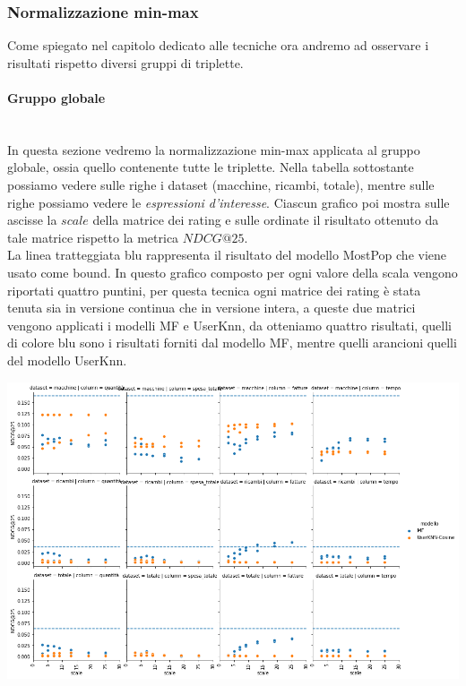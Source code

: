 
\subsubsection{Normalizzazione min-max}
Come spiegato nel capitolo dedicato alle tecniche ora andremo ad osservare i risultati rispetto diversi gruppi di triplette.\\

\paragraph{Gruppo globale}\mbox{} \\
In questa sezione vedremo la normalizzazione min-max applicata al gruppo globale, ossia quello contenente tutte le triplette.
Nella tabella sottostante possiamo vedere sulle righe i dataset (macchine, ricambi, totale), mentre sulle righe possiamo vedere le \textit{espressioni d'interesse}. Ciascun grafico poi mostra sulle ascisse la $scale$ della matrice dei rating e sulle ordinate il risultato ottenuto da tale matrice rispetto la metrica $NDCG@25$. \\
La linea tratteggiata blu rappresenta il risultato del modello MostPop che viene usato come bound.
In questo grafico composto per ogni valore della scala vengono riportati quattro puntini, per questa tecnica ogni matrice dei rating è stata tenuta sia in versione continua che in versione intera, a queste due matrici vengono applicati i modelli MF e UserKnn, da otteniamo quattro risultati, quelli di colore blu sono i risultati forniti dal modello MF, mentre quelli arancioni quelli del modello UserKnn.

\includegraphics[width=16cm]{figures/risultati_minmax_globale.png}

